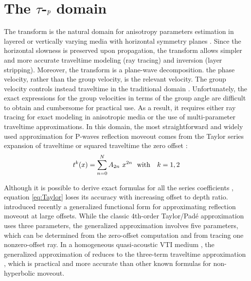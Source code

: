 \section{The $\tau$-$\lowercase{p}$ domain}

The \taup transform is the natural domain for anisotropy parameters
estimation in layered or vertically varying media with horizontal
symmetry planes
\citep{baan:1076,douma:D53,silsen,tsvankin:75A15}. Since the
horizontal slowness is preserved upon propagation, the \taup transform
allows simpler and more accurate traveltime modeling (ray tracing) and
inversion (layer stripping). Moreover, the \taup transform is a
plane-wave decomposition.   the phase
velocity, rather than the group velocity, is the relevant
velocity. The group velocity controls instead traveltime in the
traditional \tx domain \citep{ilyabook2006}. Unfortunately, the exact
expressions for the group velocities in terms of the group angle are
difficult to obtain and cumbersome for practical use. As a result, it
requires either ray tracing for exact \tx modeling in anisotropic
media or the use of multi-parameter traveltime approximations.  In
this domain, the most straightforward and widely used approximation
for P-waves reflection moveout comes from the Taylor series expansion
of traveltime or squared traveltime   the
zero offset \citep{taner:859,ursin:D23}:
\begin{equation}
t^{k}(x)=\dsum_{n=0}^N A_{2n}~x^{2n} \mbox{\ \ with \ \ } k=1,2  \label{eq:Taylor}
\end{equation}




Although it is possible to derive exact formulas for all the series
coefficients \citep{al-dajani:1738,tsvankin:268,ilyabook2006},
equation \ref{eq:Taylor} 
loses its accuracy with increasing offset to depth
ratio. \cite{fomel:U9} introduced recently a generalized functional
form for approximating reflection moveout at large offsets. While the
classic \cite{alkhalifah:1550} 4th-order Taylor/Pad\'{e} approximation
uses three parameters, the generalized approximation involves five
parameters, which can be determined from the zero-offset computation
and from tracing one nonzero-offset ray. In a homogeneous
quasi-acoustic VTI medium \citep{alkhalifah:623}, the generalized
approximation of \cite{fomel:U9} reduces to the three-term traveltime
approximation   \cite{FomelVTI}, which is
practical and more accurate than other known 
 formulas for non-hyperbolic moveout.

